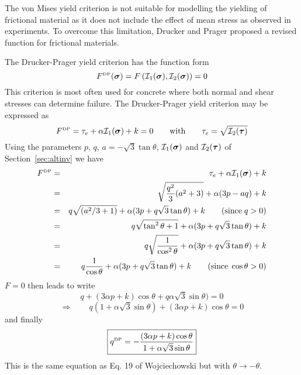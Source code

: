 The von Mises yield criterion is not suitable for modelling the yielding of frictional material 
as it does not include the effect of mean stress as observed in experiments. To overcome this 
limitation, Drucker and Prager \cite{drpr52} proposed a revised function for frictional materials.

The Drucker-Prager yield criterion has the function form
\begin{equation}
F^{\text{\tiny DP}}({\bm \sigma})=F \left( {\cal I}_1({\bm \sigma}), {\cal I}_2({\bm \sigma}) \right) = 0 
\end{equation}
This criterion is most often used for concrete where both normal and shear stresses 
can determine failure. The Drucker-Prager yield criterion may be expressed as
\begin{equation}
F^{\text{\tiny DP}}=\tau_e + \alpha {\cal I}_1({\bm \sigma}) + k =0  
\qquad
{\rm with}
\qquad
\tau_e= \sqrt{{\cal I}_2({\bm \tau})} \label{dpcriterion} 
\end{equation}
Using the parameters $p$, $q$, $a=-\sqrt{3}\tan\theta$, ${\cal I}_1({\bm \sigma})$ 
and ${\cal I}_2({\bm \tau})$
of Section~\ref{sec:altinv} we have
\begin{eqnarray}
F^{\text{\tiny DP}}
&=& \tau_e + \alpha {\cal I}_1({\bm \sigma}) + k \nonumber\\
&=& \sqrt{\frac{q^2}{3}(a^2+3)} + \alpha (3p-aq) + k \nonumber\\ 
&=& q \sqrt{(a^2/3+1)} + \alpha (3p+q\sqrt{3}\tan\theta ) + k    \qquad ({\rm since }\; q>0)\nonumber\\ 
&=& q \sqrt{\tan^2\theta+1} + \alpha (3p+q\sqrt{3}\tan\theta ) + k  \nonumber\\
&=& q \sqrt{ \frac{1}{\cos^2\theta} } + \alpha (3p+q\sqrt{3}\tan\theta ) + k  \nonumber\\
&=& q \frac{1}{\cos\theta}  + \alpha (3p+q\sqrt{3}\tan\theta ) + k  \qquad ({\rm since }\; \cos\theta >0)\nonumber
\end{eqnarray}
$F=0$ then leads to write
\[
q  + (3 \alpha p+k)\cos\theta  + q \alpha \sqrt{3}\sin\theta ) =0
\]
\[
\Rightarrow \qquad q(1 + \alpha \sqrt{3}\sin\theta)  + (3 \alpha p+k)\cos\theta =0
\]
and finally
\[
\boxed{
q^{\text{\tiny DP}} = -\frac{(3 \alpha p+k)\cos\theta}{1 + \alpha \sqrt{3}\sin\theta}
}
\]
This is the same equation as Eq. 19 of Wojciechowski \cite{wojc18} but with $\theta \rightarrow -\theta$. 

